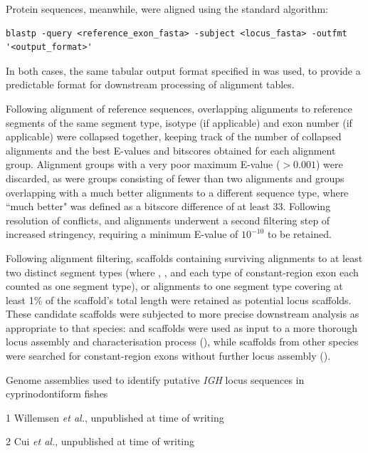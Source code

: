 Protein sequences, meanwhile, were aligned using the standard  algorithm:

\begin{lstlisting}
blastp -query <reference_exon_fasta> -subject <locus_fasta> -outfmt '<output_format>'
\end{lstlisting}

In both cases, the same tabular output format specified in  was used, to provide a predictable format for downstream processing of  alignment tables.

Following alignment of reference sequences, overlapping alignments to reference segments of the same segment type, isotype (if applicable) and exon number (if applicable) were collapsed together, keeping track of the number of collapsed alignments and the best E-values and bitscores obtained for each alignment group. Alignment groups with a very poor maximum E-value ($> 0.001$) were discarded, as were groups consisting of fewer than two alignments and groups overlapping with a much better alignments to a different sequence type, where ``much better" was defined as a bitscore difference of at least 33. Following resolution of conflicts, \vh and \ch alignments underwent a second filtering step of increased stringency, requiring a minimum E-value of $10^{-10}$ to be retained. 

Following alignment filtering, scaffolds containing surviving alignments to at least two distinct segment types (where \vh, \jh, and each type of constant-region exon each counted as one segment type), or alignments to one segment type covering at least 1\% of the scaffold's total length were retained as potential locus scaffolds. These candidate scaffolds were subjected to more precise downstream analysis as appropriate to that species: \Nfu and \Xma scaffolds were used as input to a more thorough locus assembly and characterisation process (), while scaffolds from other species were searched for constant-region exons without further locus assembly ().

\begin{table}
\centering
\caption{Genome assemblies used to identify putative \textit{IGH} locus sequences in cyprinodontiform fishes}
\begin{threeparttable}

\begin{tablenotes}
\item[1] Willemsen \textit{et al.}, unpublished at time of writing
\item[2] Cui \textit{et al.}, unpublished at time of writing
\end{tablenotes} %
\end{threeparttable}
\label{tab:cyprinodontiform-genomes}
\end{table}

